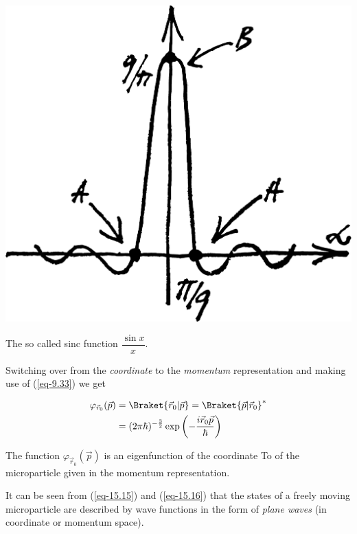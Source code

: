 \documentclass[a4paper,sfsidenotes,colorlinks=true]{tufte-book}
\numberwithin{equation}{section}
\numberwithin{figure}{section}
\begin{document}
\begin{marginfigure}%
\centering
\includegraphics[width=\textwidth]{figures/fig-15-01.pdf}
\caption{The so called sinc function $\dfrac{\sin x }{x}$.}
\label{fig-15.1}
\end{marginfigure}

Switching over from the \emph{coordinate} to the \emph{momentum}
representation and making use of (\ref{eq-9.33}) we get 

\begin{equation}%
\begin{split}
 \varphi_{\vec{r}_{0}} (\vec{p}) & = \Braket{\vec{r}_{0}| \vec{p}}  = \Braket{\vec{p}| \vec{r}_{0}}^{*} \\
& = (2 \pi \hbar)^{-\frac{3}{2}} \exp \left(- \frac{ i \vec{r}_{0} \vec{p}}{\hbar} \right)
\end{split}
\label{eq-15.16}
\end{equation}

The function $\varphi_{\vec{r}_{0}} (\vec{p})$ is an eigenfunction of
the coordinate To of the microparticle given in the momentum
representation.


It can be seen from (\ref{eq-15.15}) and (\ref{eq-15.16}) that the states of a freely
moving microparticle are described by wave functions in the form of
\emph{plane waves} (in coordinate or momentum space).
\end{document}
